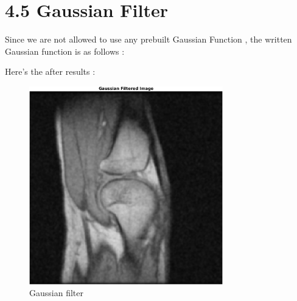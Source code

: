 \documentclass[12pt,fleqn]{article}
\begin{document}
\section{4.5 Gaussian Filter}
Since we are not allowed to use any prebuilt Gaussian Function , the written Gaussian function is as follows :

Here's the after results :
\begin{figure}[H]
	\centering
	\includegraphics[width=0.75\textwidth]{gaussianFilteredimage.png}
	\caption{Gaussian filter}
	\label{fig:2.3.3}
\end{figure}
\end{document}
